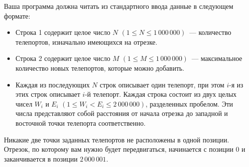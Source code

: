 Ваша программа должна читать из стандартного ввода данные в следующем формате:
\begin{itemize}
\item Строка 1 содержит целое число $N$ $(1 \le N \le 1\,000\,000)$~--- количество телепортов, изначально имеющихся на
отрезке. 
\item Строка 2 содержит целое число $M$ $(1 \le M \le 1\,000\,000)$~--- максимальное количество новых телепортов, которые
можно добавить.
\item Каждая из последующих $N$ строк описывает один телепорт, при этом $i$-я из этих строк
описывает $i$-й телепорт. Каждая строка состоит из двух целых чисел $W_i$ и $E_i$ $(1 \le W_i < E_i \le 2\,000\,000)$, разделенных пробелом. Эти числа представляют собой расстояния от начала отрезка до западной и восточной точки телепорта соответственно. 
\end{itemize}

Никакие две точки заданных телепортов не расположены в одной позиции. Отрезок, по которому
вам нужно будет передвигаться, начинается с позиции $0$ и заканчивается в позиции $2\,000\,001$. 